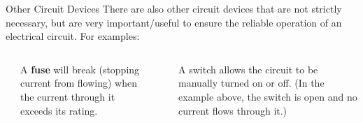 \documentclass[12pt,aspectratio=169]{beamer}
\begin{document}
\begin{frame}{Other Circuit Devices}
  There are also other circuit devices that are not strictly necessary, but
  are very important/useful to ensure the reliable operation of an electrical
  circuit. For examples:
  \begin{columns}[T]
    \begin{center}
      \vspace{.15in}
    \end{center}
    A \textbf{fuse} will break (stopping current from flowing) when the
    current through it exceeds its rating.

    \begin{center}
    \end{center}
    \vspace{.03in}A switch allows the circuit to be manually turned on or off.
    (In the example above, the switch is open and no current flows through it.)
  \end{columns}
\end{frame}
\end{document}
